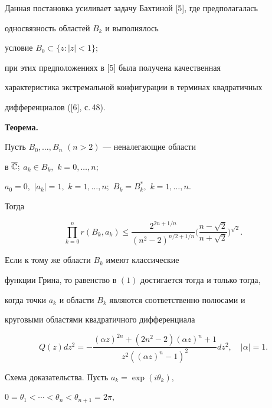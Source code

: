 Данная постановка усиливает задачу Бахтиной [5], где предполагалась


односвязность областей $B_k$ и выполнялось


условие $B_0\subset\{z: |z|<1\};$


при этих предположениях в [5] была получена качественная


характеристика экстремальной конфигурации в терминах квадратичных


дифференциалов ([6], с.\,48).


\medskip





{\bf Теорема.} {\it


Пусть $B_0,\dotsc,B_n$ $(n>2)$ --- неналегающие области


в $\overline{\Bbb C};$ $a_k\in B_k,$ $k=0,\dotsc,n;$


$a_0=0,$ $|a_k|=1,$ $k=1,\dotsc,n;$ $B_k=B_k^*,$ $k=1,\dotsc,n.$


Тогда


\begin{equation}


\prod_{k=0}^n r(B_k,a_k)\le\frac{2^{2n+1/n}}{(n^2-2)^{n/2+1/n}}


\bigg(\frac{n-\sqrt{2}}{n+\sqrt{2}}\bigg)^{\sqrt{2}}.


\end{equation}





Если к тому же области $B_k$ имеют классические


функции Грина, то равенство в $(1)$ достигается тогда и только тогда,


когда точки $a_k$ и области $B_k$ являются соответственно полюсами и


круговыми областями квадратичного дифференциала


$$


Q(z)dz^2=-\frac{({\alpha}z)^{2n}+(2n^2-2)({\alpha}z)^n+1}


{z^2(({\alpha}z)^n-1)^2}


dz^2,\quad |{\alpha}|=1.


$$


}


\medskip





Схема доказательства. Пусть $a_k=\exp(i\theta_k),$


$0=\theta_1<\dotsb<\theta_n<\theta_{n+1}=2\pi,$


